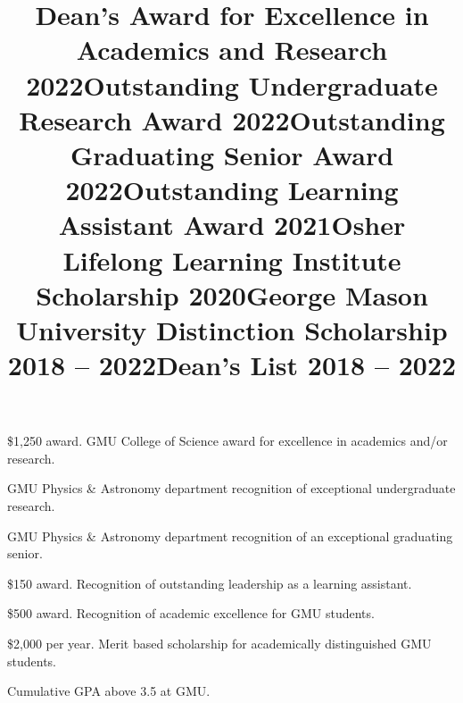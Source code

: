 \documentclass[marg, centered]{res}
\begin{document}
\begin{resume}
\vspace{-0.3cm}
\title{\textbf{Dean's Award for Excellence in Academics and Research} \hfill {\textbf{2022}}}
\begin{position}
\$1,250 award.  GMU College of Science award for excellence in academics and/or research.
\end{position}

\vspace{-0.3cm}
\title{\textbf{Outstanding Undergraduate Research Award} \hfill \textbf{2022}}
\begin{position}
GMU Physics \& Astronomy department recognition of exceptional undergraduate research.
\end{position}

\vspace{-0.3cm}
\title{\textbf{Outstanding Graduating Senior Award} \hfill \textbf{2022}}
\begin{position}
GMU Physics \& Astronomy department recognition of an exceptional graduating senior.
\end{position}

\vspace{-0.3cm}
\title{\textbf{Outstanding Learning Assistant Award} \hfill \textbf{2021}}
\begin{position}
\$150 award.  Recognition of outstanding leadership as a learning assistant.
\end{position}

\vspace{-0.3cm}
\title{\textbf{Osher Lifelong Learning Institute Scholarship} \hfill \textbf{2020}}
\begin{position}
\$500 award.  Recognition of academic excellence for GMU students.
\end{position}

\vspace{-0.3cm}
\title{\textbf{George Mason University Distinction Scholarship} \hfill \textbf{2018 -- 2022}}
\begin{position}
\$2,000 per year. Merit based scholarship for academically distinguished GMU students.
\end{position}

\vspace{-0.3cm}
\title{\textbf{Dean's List} \hfill \textbf{2018 -- 2022}}
\begin{position}
Cumulative GPA above 3.5 at GMU.
\end{position}

\newpage

\end{resume}
\end{document}
